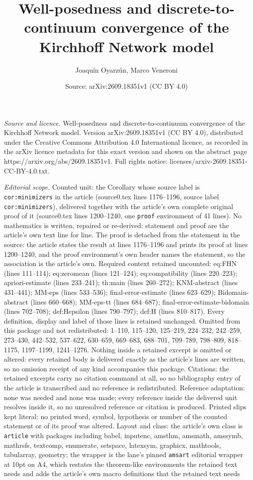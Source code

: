 \documentclass[10pt,a4paper]{amsart}
\title[Well-posedness and discrete-to-continuum convergence of the ]{Well-posedness and discrete-to-continuum convergence of the Kirchhoff Network model}
\author{Joaqu\'in Oyarz\'un, Marco Veneroni}
\date{Source: arXiv:2609.18351v1 (CC BY 4.0)}
\begin{document}
\maketitle

\noindent\emph{Source and licence.} Well-posedness and discrete-to-continuum convergence of the Kirchhoff Network model. Version arXiv:2609.18351v1 (CC BY 4.0), distributed under the Creative Commons Attribution 4.0 International licence, as recorded in the arXiv licence metadata for this exact version and shown on the abstract page https://arxiv.org/abs/2609.18351v1. Full rights notice: licenses/arxiv-2609.18351-CC-BY-4.0.txt.\par\smallskip

\noindent\textit{Editorial scope.} Counted unit: the Corollary whose source label is \texttt{cor:minimizers} in the article (source0.tex lines 1176--1196, source label \texttt{cor:minimizers}), delivered together with the article's own complete original proof of it (source0.tex lines 1200--1240, one \texttt{proof} environment of 41 lines). No mathematics is written, repaired or re-derived: statement and proof are the article's own text line for line. The proof is detached from the statement in the source: the article states the result at lines 1176--1196 and prints its proof at lines 1200--1240, and the proof environment's own header names the statement, so the association is the article's own. Required context retained uncounted: eq:FHN (lines 111--114); eq:zeromean (lines 121--124); eq:compatibility (lines 220--223); apriori-estimate (lines 233--241); th:main (lines 260--272); KNM-abstract (lines 431--441); MM-eps (lines 533--536); final-error-estimate (lines 623--629); Bidomain-abstract (lines 660--668); MM-eps-tt (lines 684--687); final-error-estimate-bidomain (lines 702--708); def:Hepsilon (lines 790--797); def:H (lines 810--817). Every definition, display and label of those lines is retained unchanged. Omitted from this package and not redistributed: 1--110, 115--120, 125--219, 224--232, 242--259, 273--430, 442--532, 537--622, 630--659, 669--683, 688--701, 709--789, 798--809, 818--1175, 1197--1199, 1241--1276. Nothing inside a retained excerpt is omitted or altered: every retained body is delivered exactly as the article's lines are written, so no omission receipt of any kind accompanies this package. Citations: the retained excerpts carry no citation command at all, so no bibliography entry of the article is transcribed and no reference is redistributed. Reference adaptation: none was needed and none was made; every reference inside the delivered unit resolves inside it, so no unresolved reference or citation is produced. Printed slips kept literal: no printed word, symbol, hypothesis or number of the counted statement or of its proof was altered. Layout and class: the article's own class is \texttt{article} with packages including babel, inputenc, amsthm, amsmath, amssymb, mathrsfs, textcomp, enumerate, setspace, latexsym, graphicx, mathtools, tabularray, geometry; the wrapper is the lane's pinned \texttt{amsart} editorial wrapper at 10pt on A4, which restates the theorem-like environments the retained text needs and adds the article's own macro definitions that the retained text needs 
\end{document}
